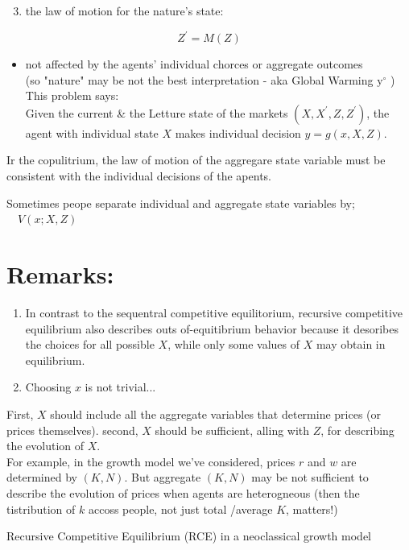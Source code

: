 \documentclass[10pt]{article}
\begin{document}
\begin{enumerate}
  \setcounter{enumi}{2}
  \item the law of motion for the nature's state:
\end{enumerate}

$$
Z^{\prime}=M(Z)
$$

\begin{itemize}
  \item not affected by the agents' individual chorces or aggregate outcomes\\
(so "nature" may be not the best interpretation - aka Global Warming $\mathrm{y}^{\circ}$ )\\
This problem says:\\
Given the current \& the Letture state of the markets $\left(X, X^{\prime}, Z, Z^{\prime}\right)$, the agent with individual state $X$ makes individual decision $y=g(x, X, Z)$.
\end{itemize}

Ir the copulitrium, the law of motion of the aggregare state variable must be consistent with the individual decisions of the apents.

Sometimes peope separate individual and aggregate state variables by; $\quad V(x ; X, Z)$

\section*{Remarks:}
\begin{enumerate}
  \item In contrast to the sequentral competitive equilitorium, recursive competitive equilibrium also describes outs of-equitibrium behavior because it desoribes the choices for all possible $X$, while only some values of $X$ may obtain in equilibrium.
  \item Choosing $x$ is not trivial...
\end{enumerate}

First, $X$ should include all the aggregate variables that determine prices (or prices themselves). second, $X$ should be sufficient, alling with $Z$, for describing the evolution of $X$.\\
For example, in the growth model we've considered, prices $r$ and $w$ are determined by $(K, N)$. But aggregate $(K, N)$ may be not sufficient to describe the evolution of prices when agents are heterogneous (then the tistribution of $k$ accoss people, not just total /average $K$, matters!)

Recursive Competitive Equilibrium (RCE) in a neoclassical growth model
\end{document}
